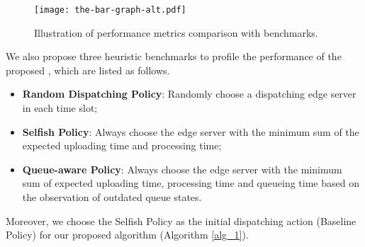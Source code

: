 \begin{figure}[ht]                                                      %
    \centering                                                          %
    \texttt{[image: the-bar-graph-alt.pdf]}               %
    \caption{Illustration of performance metrics comparison with benchmarks.}
    \label{fig:bar_plot}                                                %
\end{figure}                                                            %

We also propose {three heuristic benchmarks to profile the performance of the proposed \algname}, which are listed as follows.
\begin{itemize}
    \item \textbf{Random Dispatching Policy}:
            Randomly choose a dispatching edge server in each time slot; 
    \item \textbf{Selfish Policy}:
            Always choose the edge server with the minimum sum of the expected uploading time and processing time;
    \item \textbf{Queue-aware Policy}:
            Always choose the edge server with the minimum sum of expected uploading time, processing time and queueing time based on the observation of outdated queue states.
\end{itemize}
Moreover, we choose the Selfish Policy as the initial dispatching action (Baseline Policy) for our proposed algorithm (Algorithm \ref{alg_1}).

